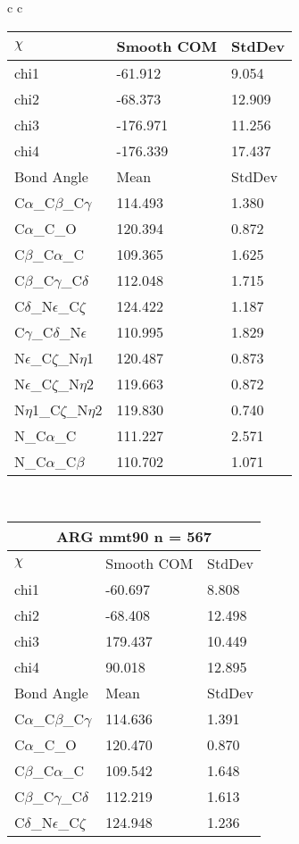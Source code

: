 \begin{longtable}{ c c }
\begin{tabular}{ l l l }
  $\chi$       & Smooth COM & StdDev \\ \midrule
  chi1 & -61.912 & 9.054 \\ 
  chi2 & -68.373 & 12.909 \\ 
  chi3 & -176.971 & 11.256 \\ 
  chi4 & -176.339 & 17.437 \\ \midrule
  Bond Angle   & Mean     & StdDev \\ \midrule
  C$\alpha$\_C$\beta$\_C$\gamma$ & 114.493 & 1.380\\
  C$\alpha$\_C\_O & 120.394 & 0.872\\
  C$\beta$\_C$\alpha$\_C & 109.365 & 1.625\\
  C$\beta$\_C$\gamma$\_C$\delta$ & 112.048 & 1.715\\
  C$\delta$\_N$\epsilon$\_C$\zeta$ & 124.422 & 1.187\\
  C$\gamma$\_C$\delta$\_N$\epsilon$ & 110.995 & 1.829\\
  N$\epsilon$\_C$\zeta$\_N$\eta$1 & 120.487 & 0.873\\
  N$\epsilon$\_C$\zeta$\_N$\eta$2 & 119.663 & 0.872\\
  N$\eta$1\_C$\zeta$\_N$\eta$2 & 119.830 & 0.740\\
  N\_C$\alpha$\_C & 111.227 & 2.571\\
  N\_C$\alpha$\_C$\beta$ & 110.702 & 1.071\\
  \bottomrule
  \end{tabular}
  \\
  \begin{tabular}{ l l l }
  \toprule
  \multicolumn{3}{c}{ARG \textbf{mmt90} n = 567} \\ \toprule
  $\chi$       & Smooth COM & StdDev \\ \midrule
  chi1 & -60.697 & 8.808 \\ 
  chi2 & -68.408 & 12.498 \\ 
  chi3 & 179.437 & 10.449 \\ 
  chi4 & 90.018 & 12.895 \\ \midrule
  Bond Angle   & Mean     & StdDev \\ \midrule
  C$\alpha$\_C$\beta$\_C$\gamma$ & 114.636 & 1.391\\
  C$\alpha$\_C\_O & 120.470 & 0.870\\
  C$\beta$\_C$\alpha$\_C & 109.542 & 1.648\\
  C$\beta$\_C$\gamma$\_C$\delta$ & 112.219 & 1.613\\
  C$\delta$\_N$\epsilon$\_C$\zeta$ & 124.948 & 1.236\\

\end{tabular}
\end{longtable}
